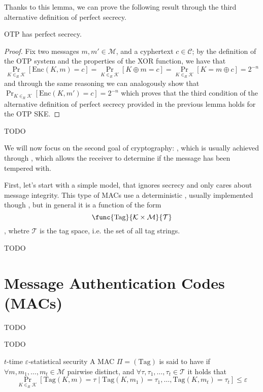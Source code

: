 \documentclass[a4paper, 12pt]{report}
\begin{document}
Thanks to this lemma, we can prove the following result through the third alternative definition of perfect secrecy.

\begin{framedthm}{}
	OTP has perfect secrecy.
\end{framedthm}

\begin{proof}
	Fix two messages $m, m' \in \mathcal M$, and a cyphertext $c \in \mathcal C$; by the definition of the OTP system and the properties of the XOR function, we have that $$\Pr_{K \in_R \mathcal K}[\mathrm{Enc}(K, m) = c] = \Pr_{K \in_R \mathcal K}[K \oplus m = c] = \Pr_{K \in_R \mathcal K}[K = m \oplus c] = 2^{-n}$$ and through the same reasoning we can analogously show that $\Pr_{K \in_R \mathcal K}[\mbox{Enc}(K, m') = c] = 2^{-n}$ which proves that the third condition of the alternative definition of perfect secrecy provided in the previous lemma holds for the OTP SKE.
\end{proof}

TODO 

We will now focus on the second goal of cryptography: , which is usually achieved through , which allows the receiver to determine if the message has been tempered with.

First, let's start with a simple model, that ignores secrecy and only cares about message integrity. This type of MACs use a deterministic , usually implemented though , but in general it is a function of the form $$\func{\mbox{Tag}}{\mathcal K \times \mathcal M}{\mathcal T}$$, whetre $\mathcal T$ is the tag space, i.e. the set of all tag strings.

TODO 

\section{Message Authentication Codes (MACs)}

TODO 

TODO 

\begin{frameddefn}{$t$-time $\varepsilon$-statistical security}
	A MAC $\Pi = (\mbox{Tag})$ is said to have  if $\forall m, m_1, \ldots, m_t \in \mathcal M$ pairwise distinct, and $\forall \tau, \tau_1, \ldots, \tau_t \in \mathcal T$ it holds that $$\Pr_{K \in_R \mathcal K}[\mbox{Tag}(K, m) = \tau \mid \mbox{Tag}(K, m_1) = \tau_1, \ldots, \mbox{Tag}(K, m_t) = \tau_t] \le \varepsilon$$
\end{frameddefn}
\end{document}

